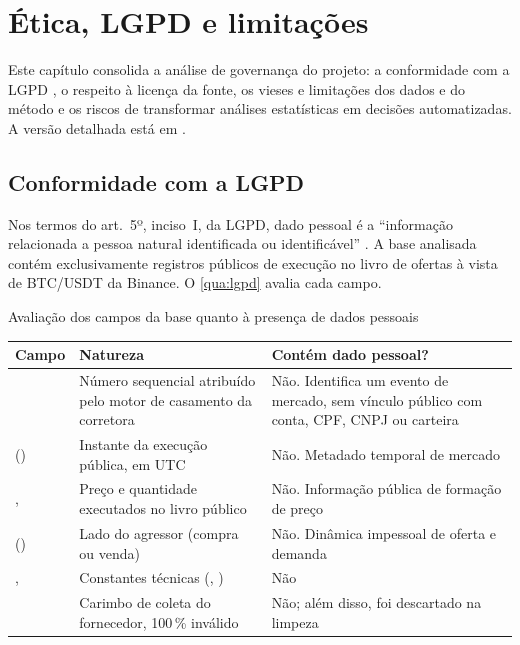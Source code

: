 \chapter{Ética, LGPD e limitações}\label{cap:etica}

Este capítulo consolida a análise de governança do projeto: a conformidade com a
LGPD \cite{brasil2018}, o respeito à licença da fonte, os vieses e limitações dos
dados e do método e os riscos de transformar análises estatísticas em decisões
automatizadas. A versão detalhada está em .

\section{Conformidade com a LGPD}\label{sec:lgpd}

Nos termos do art.~5º, inciso~I, da LGPD, dado pessoal é a ``informação
relacionada a pessoa natural identificada ou identificável''
\cite[art.~5º, I]{brasil2018}. A base analisada contém exclusivamente registros
públicos de execução no livro de ofertas à vista de BTC/USDT da Binance. O
\autoref{qua:lgpd} avalia cada campo.

\begin{quadro}[htbp]
\caption{\label{qua:lgpd}Avaliação dos campos da base quanto à presença de dados pessoais}
\begin{corpotabela}
\begin{tabularx}{\textwidth}{|L{3.0cm}|Y|L{4.6cm}|}
\hline
\textbf{Campo} & \textbf{Natureza} & \textbf{Contém dado pessoal?} \\ \hline
{} & Número sequencial atribuído pelo motor de casamento da corretora & Não. Identifica um evento de mercado, sem vínculo público com conta, CPF, CNPJ ou carteira \\ \hline
{} () & Instante da execução pública, em UTC & Não. Metadado temporal de mercado \\ \hline
{},  & Preço e quantidade executados no livro público & Não. Informação pública de formação de preço \\ \hline
{} () & Lado do agressor (compra ou venda) & Não. Dinâmica impessoal de oferta e demanda \\ \hline
{},  & Constantes técnicas (, ) & Não \\ \hline
{} & Carimbo de coleta do fornecedor, 100\,\% inválido & Não; além disso, foi descartado na limpeza \\ \hline
\end{tabularx}
\end{corpotabela}
\fonteautores[Elaborado]
\end{quadro}

